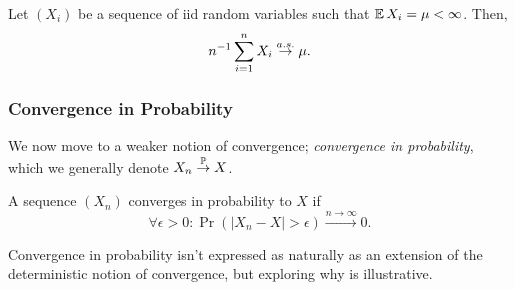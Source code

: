 \begin{theorem}
    Let $(X_i)$ be a sequence of iid random variables such that 
    $\operatorname*{\mathbb{E}} X_i = \mu < \infty$. Then,
    \[
        n^{-1} \sum_{i=1}^{n} X_i 
        \overset{a.s.}{\rightarrow}
        \mu.
    \]
\end{theorem}

\subsubsection{Convergence in Probability}

We now move to a weaker notion of convergence; \emph{convergence in probability},
which we generally denote $X_n \overset{\operatorname*{\mathbb{P}}}{\rightarrow} X$.

\begin{definition}
    A sequence $(X_n)$ converges in probability to $X$ if 
    \[
        \forall \epsilon > 0:
        \Pr \left( |X_n - X| > \epsilon \right) \stackrel{n \rightarrow \infty}{\rightarrow} 0.
    \]
\end{definition}


Convergence in probability isn't expressed as naturally as an extension of the 
deterministic notion of convergence, but exploring why is illustrative.

